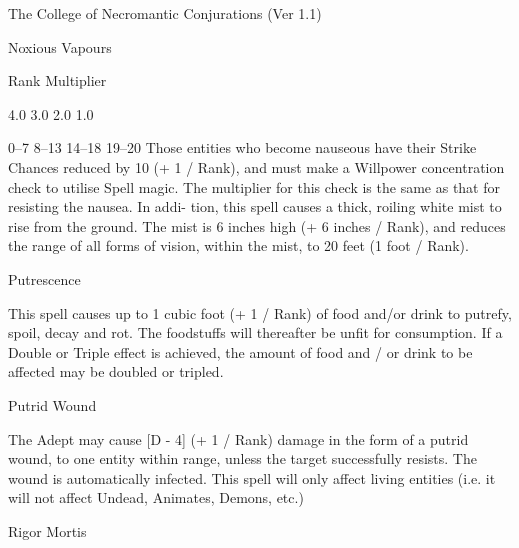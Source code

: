 \begin{Chapter}{The College of Necromantic Conjurations (Ver 1.1)}
\begin{spell}[G-6]{Noxious Vapours}
\begin{effects}
Rank  Multiplier 

4.0 
3.0 
2.0 
1.0 

0–7 
8–13 
14–18 
19–20 
Those  entities  who  become  nauseous  have  their 
Strike  Chances  reduced  by  10  (+  1  /  Rank),  and 
must  make  a  Willpower  concentration  check  to 
utilise Spell magic. The multiplier for this check is 
the  same  as  that  for  resisting  the  nausea.  In  addi-
tion, this spell causes a thick, roiling white mist to 
rise from the ground. The mist is 6 inches high (+ 6 
inches / Rank), and reduces the range of all forms 
of  vision,  within  the  mist,  to  20  feet  (1  foot  / 
Rank). 

\end{effects}
\end{spell}

\begin{spell}[G-7]{Putrescence}

\begin{effects}
This spell causes up to 1 cubic foot (+ 1 / Rank) of food and/or drink
to putrefy, spoil, decay and rot.  The foodstuffs will thereafter be
unfit for consumption.  If a Double or Triple effect is achieved, the
amount of food and / or drink to be affected may be doubled or
tripled.
\end{effects}
\end{spell}

\begin{spell}[G-8]{Putrid Wound}

\begin{effects}
The Adept may cause [D - 4] (+ 1 / Rank) damage in the form of a
putrid wound, to one entity within range, unless the target
successfully resists.  The wound is automatically infected.  This
spell will only affect living entities (i.e. it will not affect
Undead, Animates, Demons, etc.)
\end{effects}
\end{spell}

\begin{spell}[G-9]{Rigor Mortis}


\end{spell}
\end{Chapter}
